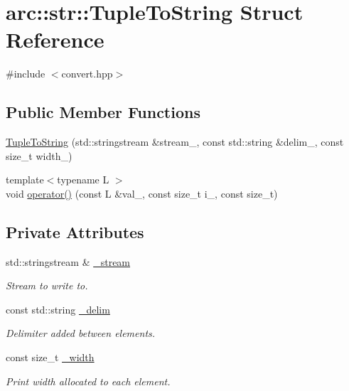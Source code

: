 \hypertarget{structarc_1_1str_1_1_tuple_to_string}{}\section{arc\+:\+:str\+:\+:Tuple\+To\+String Struct Reference}
\label{structarc_1_1str_1_1_tuple_to_string}


{\ttfamily \#include $<$convert.\+hpp$>$}

\subsection*{Public Member Functions}
\begin{DoxyCompactItemize}
\item 
\mbox{\hyperlink{structarc_1_1str_1_1_tuple_to_string_ac2dac7554cf6813ef164c9ea01f3553a}{Tuple\+To\+String}} (std\+::stringstream \&stream\+\_\+, const std\+::string \&delim\+\_\+, const size\+\_\+t width\+\_\+)
\item 
{\footnotesize template$<$typename L $>$ }\\void \mbox{\hyperlink{structarc_1_1str_1_1_tuple_to_string_a91460084c852e91c61887015e0f91a7b}{operator()}} (const L \&val\+\_\+, const size\+\_\+t i\+\_\+, const size\+\_\+t)
\end{DoxyCompactItemize}
\subsection*{Private Attributes}
\begin{DoxyCompactItemize}
\item 
std\+::stringstream \& \mbox{\hyperlink{structarc_1_1str_1_1_tuple_to_string_adfa1e5289a45d5c1449694835b99fe68}{\+\_\+stream}}
\begin{DoxyCompactList}\small\item\em Stream to write to. \end{DoxyCompactList}\item 
const std\+::string \mbox{\hyperlink{structarc_1_1str_1_1_tuple_to_string_a822dbcaf492224fab6645ebf8dc7e5b1}{\+\_\+delim}}
\begin{DoxyCompactList}\small\item\em Delimiter added between elements. \end{DoxyCompactList}\item 
const size\+\_\+t \mbox{\hyperlink{structarc_1_1str_1_1_tuple_to_string_aa99def2d3e4827b56a2bc8a9e4b08e1e}{\+\_\+width}}
\begin{DoxyCompactList}\small\item\em Print width allocated to each element. \end{DoxyCompactList}\end{DoxyCompactItemize}


